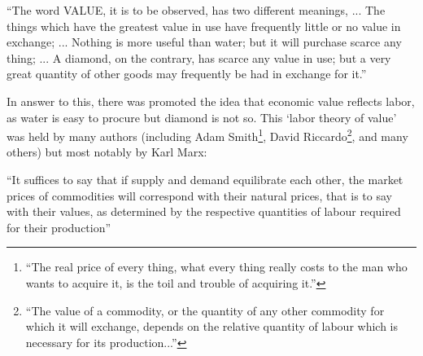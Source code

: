 
\begin{displayquote}
``The word VALUE, it is to be observed, has two different meanings, ... The things which have the greatest value in use have frequently little or no value in exchange; ... Nothing is more useful than water; but it will purchase scarce any thing; ... A diamond, on the contrary, has scarce any value in use; but a very great quantity of other goods may frequently be had in exchange for it.'' \citep{Smith1Gutenberg}
\end{displayquote}

In answer to this, there was promoted the idea that economic value reflects labor, as water is easy to procure but diamond is not so.
This `labor theory of value' was held by many authors (including Adam Smith\footnote{``The real price of every thing, what every thing really costs to the man who wants to acquire it, is the toil and trouble of acquiring it.''\cite{Smith1Gutenberg}}, David Riccardo\footnote{``The value of a commodity, or the quantity of any other commodity for which it will exchange, depends on the relative quantity of labour which is necessary for its production...''\cite[Section 1, Chapter 1]{Riccardo1Gutenberg}}, and many others) but most notably by Karl Marx:

\begin{displayquote}
``It suffices to say that if supply and demand equilibrate each other, the market prices of commodities will correspond with their natural prices, that is to say with their values, as determined by the respective quantities of labour required for their production'' \cite[Chapter 2]{marx1910value}
\end{displayquote}

